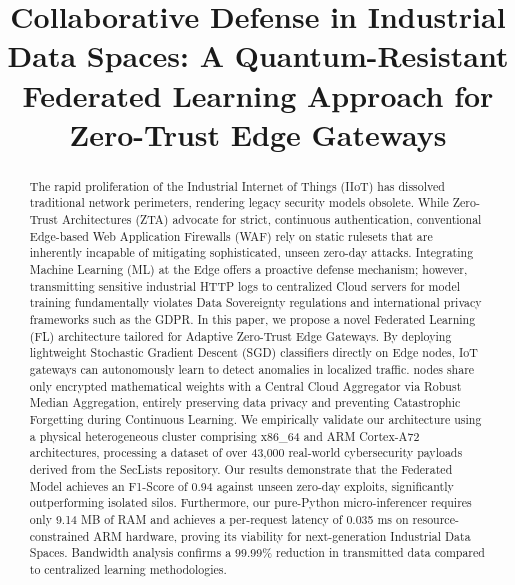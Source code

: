 \documentclass[conference]{IEEEtran}
\begin{document}
\title{Collaborative Defense in Industrial Data Spaces: A Quantum-Resistant Federated Learning Approach for Zero-Trust Edge Gateways}

\author{
}

\maketitle

\begin{abstract}
The rapid proliferation of the Industrial Internet of Things (IIoT) has dissolved traditional network perimeters, rendering legacy security models obsolete. While Zero-Trust Architectures (ZTA) advocate for strict, continuous authentication, conventional Edge-based Web Application Firewalls (WAF) rely on static rulesets that are inherently incapable of mitigating sophisticated, unseen zero-day attacks. Integrating Machine Learning (ML) at the Edge offers a proactive defense mechanism; however, transmitting sensitive industrial HTTP logs to centralized Cloud servers for model training fundamentally violates Data Sovereignty regulations and international privacy frameworks such as the GDPR. In this paper, we propose a novel Federated Learning (FL) architecture tailored for Adaptive Zero-Trust Edge Gateways. By deploying lightweight Stochastic Gradient Descent (SGD) classifiers directly on Edge nodes, IoT gateways can autonomously learn to detect anomalies in localized traffic. nodes share only encrypted mathematical weights with a Central Cloud Aggregator via Robust Median Aggregation, entirely preserving data privacy and preventing Catastrophic Forgetting during Continuous Learning. We empirically validate our architecture using a physical heterogeneous cluster comprising x86\_64 and ARM Cortex-A72 architectures, processing a dataset of over 43,000 real-world cybersecurity payloads derived from the SecLists repository. Our results demonstrate that the Federated Model achieves an F1-Score of 0.94 against unseen zero-day exploits, significantly outperforming isolated silos. Furthermore, our pure-Python micro-inferencer requires only 9.14 MB of RAM and achieves a per-request latency of 0.035 ms on resource-constrained ARM hardware, proving its viability for next-generation Industrial Data Spaces. Bandwidth analysis confirms a 99.99\% reduction in transmitted data compared to centralized learning methodologies.
\end{abstract}
\end{document}

